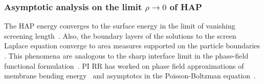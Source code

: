 %
%  
%
\subsubsection{Asymptotic analysis on the limit $\rho\rightarrow 0$ of HAP}
The HAP energy converges to the surface energy in the limit of vanishing
screening length~\cite{Shibata2004}.
Also, the boundary layers of the solutions to the screen Laplace equation
converge to area measures supported on the particle boundaries
\cite{Lee2018, Lin2015, Shibata2004}.
This phenomena are analogous to the sharp interface limit in the phase-field functional
formulation~\cite{Modica87, MODICA1987487, LuMo89}. PI RR has worked
on phase field approximations of membrane bending
energy~\cite{0951-7715-18-3-016} and asymptotcs in the Poisson-Boltzman
equation~\cite{1531-3492_2006_2_357, Lee2018}.


